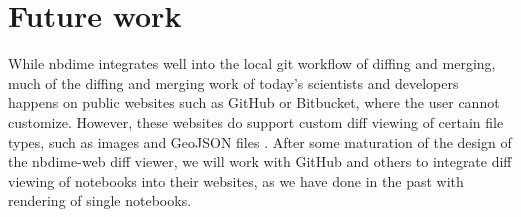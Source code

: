 \documentclass{deliverablereport}
\begin{document}


\section{Future work}

While nbdime integrates well into the local git workflow of diffing and merging,
much of the diffing and merging work of today's scientists and developers happens
on public websites such as GitHub or Bitbucket,
where the user cannot customize.
However, these websites do support custom diff viewing of certain file types,
such as images and GeoJSON files \cite{geojson-diff}.
After some maturation of the design of the nbdime-web diff viewer,
we will work with GitHub and others to integrate diff viewing of notebooks into their websites,
as we have done in the past with rendering of single notebooks.

\printbibliography
\end{document}
